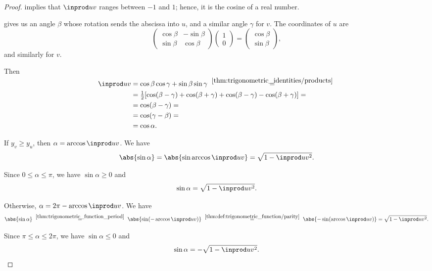 \begin{proof}
   implies that \( \inprod u v \) ranges between \( -1 \) and \( 1 \); hence, it is the cosine of a real number.

   gives us an angle \( \beta \) whose rotation sends the abscissa into \( u \), and a similar angle \( \gamma \) for \( v \). The coordinates of \( u \) are
  \begin{equation*}
    \begin{pmatrix}
      \cos \beta & -\sin \beta \\
      \sin \beta & \cos \beta
    \end{pmatrix}
    \begin{pmatrix}
      1 \\ 0
    \end{pmatrix}
    =
    \begin{pmatrix}
      \cos \beta \\ \sin \beta
    \end{pmatrix},
  \end{equation*}
  and similarly for \( v \).

  Then
  \begin{align*}
    \inprod u v
    &=
    \cos \beta \cos \gamma + \sin \beta \sin \gamma
    \reloset {\ref{thm:trigonometric_identities/products}} = \\ &=
    \tfrac 1 2 [\cos(\beta - \gamma) + \cos(\beta + \gamma) + \cos(\beta - \gamma) - \cos(\beta + \gamma)]
    = \\ &=
    \cos(\beta - \gamma)
    = \\ &=
    \cos(\gamma - \beta)
    = \\ &=
    \cos \alpha.
  \end{align*}

  If \( y_v \geq y_u \), then \( \alpha = \arccos \inprod u v \). We have
  \begin{equation*}
    \abs{\sin \alpha}
    =
    \abs{\sin \arccos \inprod u v}
    =
    \sqrt{1 - \inprod u v^2}.
  \end{equation*}

  Since \( 0 \leq \alpha \leq \pi \), we have \( \sin \alpha \geq 0 \) and
  \begin{equation*}
    \sin \alpha = \sqrt{1 - \inprod u v^2}.
  \end{equation*}

  Otherwise, \( \alpha = 2\pi - \arccos \inprod u v \). We have
  \begin{equation*}
    \abs{\sin \alpha}
    \reloset{\ref{thm:trigonometric_function_period}} =
    \abs{\sin(-\arccos \inprod u v)}
    \reloset{\ref{thm:def:trigonometric_function/parity}} =
    \abs{-\sin(\arccos \inprod u v)}
    =
    \sqrt{1 - \inprod u v^2}.
  \end{equation*}

  Since \( \pi \leq \alpha \leq 2\pi \), we have \( \sin \alpha \leq 0 \) and
  \begin{equation*}
    \sin \alpha = -\sqrt{1 - \inprod u v^2}.
  \end{equation*}
\end{proof}

